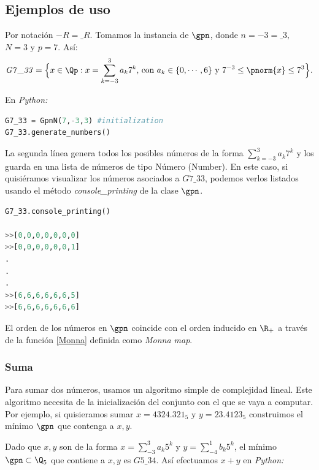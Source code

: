 
\subsection{Ejemplos de uso}
Por notación $-{R}=\_R$. Tomamos la instancia de $\gpn$, donde ${n=-3=\_{3},}$ $N=3$ y $p=7$. Así:  
\begin{equation}\label{finite_number}
\mathit{G7\_{3}3} = \Big\{x\in \Qp : x = \sum_{k=-3}^{3} a_{k} 7^{k} \text{, con $a_k\in \{0,\cdots,6\}$ y } 7^{-3}\leq\pnorm{x}\leq 7^3\Big\}.
\end{equation}
\linebreak

En \textit{Python:}
\begin{lstlisting}[language = Python, caption = inicialización de la clase $\mathit{G7\_33}$]
G7_33 = GpnN(7,-3,3) #initialization
G7_33.generate_numbers()
\end{lstlisting}
La segunda línea genera todos los posibles números de la forma $ \sum_{k=-3}^{3} a_{k} 7^{k}$ y los guarda en una lista de números de tipo Número   (Number). En este caso, si quisiéramos visualizar los números asociados a $\mathit{G7\_{3}3}$, podemos verlos listados usando el método \textit{console\_printing} de la clase $\gpn$.


\begin{lstlisting}[language = Python, caption = Visualización de números en $\mathit{G7\_33}$]
G7_33.console_printing()

>>[0,0,0,0,0,0,0]
>>[0,0,0,0,0,0,1]
.
.
.      
>>[6,6,6,6,6,6,5]
>>[6,6,6,6,6,6,6]
\end{lstlisting}
\begin{remark}
	El orden de los números en $\gpn$ coincide con el orden inducido en $\R_+$ a través de la función \ref{Monna} definida como \textit{Monna map}.
\end{remark}
\subsubsection{Suma}
Para sumar dos números, usamos un algoritmo simple de complejidad lineal. Este algoritmo necesita de la inicialización del conjunto con el que se vaya a computar. Por ejemplo, si quisieramos sumar $ x =4324.321_5$ y $y=23.4123_5$ construimos el mínimo $\gpn$ que contenga a $x,y$. 

Dado que $x,y$ son de la  forma $x=\sum_{-3}^{3}a_k5^k$ y $y=\sum_{-4}^{1}b_k5^k$, el mínimo $\gpn\subset\Q_5$ que contiene a $x,y$ es $G5\_{3}4$. Así efectuamos $x+y$ en \textit{Python:}

